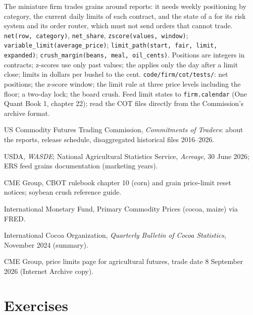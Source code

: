 \begin{build}
 The miniature firm trades grains around reports: it needs weekly positioning by
category, the current daily limits of each contract, and the state of a  for its
risk system and its order router, which must not send orders that cannot trade.
 \texttt{net(row, category)}, \texttt{net\_share}, \texttt{zscore(values, window)};
\texttt{variable\_limit(average\_price)}; \texttt{limit\_path(start, fair, limit, expanded)};
\texttt{crush\_margin(beans, meal, oil\_cents)}.
 Positions are integers in contracts; z-scores use only past values; the 
applies only the day after a limit close; limits in dollars per bushel to the cent.
 \texttt{code/firm/cot/tests/}: net positions; the z-score window; the limit
rule at three price levels including the floor; a two-day lock; the board crush.
 Feed limit states to \texttt{firm.calendar} (One Quant Book 1, chapter 22); read the
COT files directly from the Commission's archive format.
\end{build}

\begin{omsources}
\item US Commodity Futures Trading Commission, \emph{Commitments of Traders}: about the reports, release
schedule, disaggregated historical files 2016--2026.
\item USDA, \emph{WASDE}; National Agricultural Statistics Service, \emph{Acreage}, 30 June 2026; ERS
feed grains documentation (marketing years).
\item CME Group, CBOT rulebook chapter 10 (corn) and grain price-limit reset notices; soybean crush
reference guide.
\item International Monetary Fund, Primary Commodity Prices (cocoa, maize) via FRED.
\item International Cocoa Organization, \emph{Quarterly Bulletin of Cocoa Statistics}, November 2024 (summary).
\item CME Group, price limits page for agricultural futures, trade date 8 September 2026 (Internet Archive copy).
\end{omsources}

\section{Exercises}

